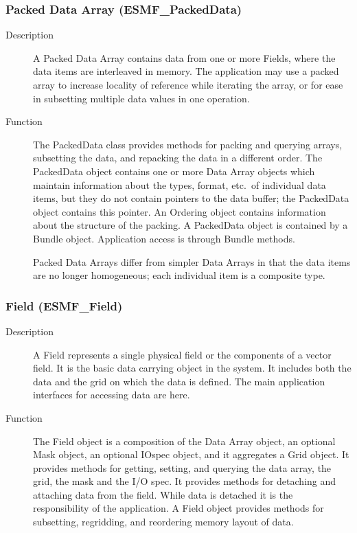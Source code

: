 \subsubsection{Packed Data Array (ESMF\_PackedData)}
\label{sec:packeddataarray} 
\begin{description}
\item [Description] A Packed Data Array contains data from one or more Fields, where the
data items are interleaved in memory. The application may use a packed array to increase
locality of reference while iterating the array, or for ease in subsetting multiple
data values in one operation.
\item [Function] The PackedData class provides methods for packing and querying arrays,
subsetting the data, and repacking the data in a different order.  The PackedData object
contains one or more Data Array objects which maintain information about the 
types, format, etc.\ of individual data items, but they do not contain
pointers to the data buffer; the PackedData object contains this pointer.
An Ordering object contains information about the structure of the packing.
A PackedData object is contained by a Bundle object.  
Application access is through Bundle methods.

Packed Data Arrays differ from simpler Data Arrays in that the data
items are no longer homogeneous; each individual item is a composite type.
\end{description}

\subsubsection{Field (ESMF\_Field)}
\label{sec:field} 
\begin{description} 
\item [Description] A Field represents a single physical field or the components of a 
vector field.  It is the basic data carrying object in the system.  It includes both
the data and the grid on which the data is defined.  The main application interfaces
for accessing data are here.
\item [Function] The Field object is a composition of the Data Array object, an optional
Mask object, an optional IOspec object, and it aggregates a Grid object.  It provides
methods for getting, setting, and querying the data array, the grid, the mask and
the I/O spec.  It provides methods for detaching and attaching data from the field.
While data is detached it is the responsibility of the application.  A Field object
provides methods for subsetting, regridding, and reordering memory layout of data.
\end{description}

